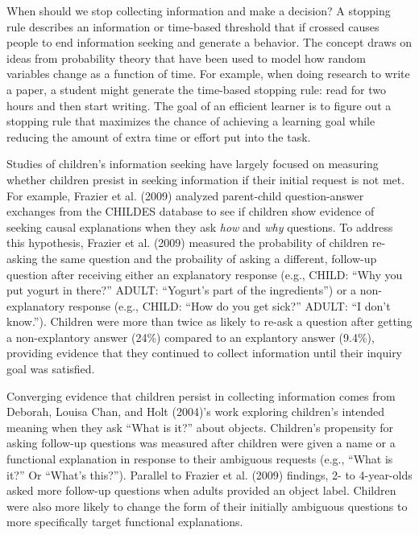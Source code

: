 \documentclass[english,floatsintext,man]{apa6}
\theoremstyle{definition}
\theoremstyle{definition}
\theoremstyle{definition}
\theoremstyle{remark}
\begin{document}
When should we stop collecting information and make a decision? A
stopping rule describes an information or time-based threshold that if
crossed causes people to end information seeking and generate a
behavior. The concept draws on ideas from probability theory that have
been used to model how random variables change as a function of time.
For example, when doing research to write a paper, a student might
generate the time-based stopping rule: read for two hours and then start
writing. The goal of an efficient learner is to figure out a stopping
rule that maximizes the chance of achieving a learning goal while
reducing the amount of extra time or effort put into the task.

Studies of children's information seeking have largely focused on
measuring whether children presist in seeking information if their
initial request is not met. For example, Frazier et al. (2009) analyzed
parent-child question-answer exchanges from the CHILDES database to see
if children show evidence of seeking causal explanations when they ask
\emph{how} and \emph{why} questions. To address this hypothesis, Frazier
et al. (2009) measured the probability of children re-asking the same
question and the probaility of asking a different, follow-up question
after receiving either an explanatory response (e.g., CHILD:
\enquote{Why you put yogurt in there?} ADULT: \enquote{Yogurt's part of
the ingredients}) or a non-explanatory response (e.g., CHILD:
\enquote{How do you get sick?} ADULT: \enquote{I don't know.}). Children
were more than twice as likely to re-ask a question after getting a
non-explantory answer (24\%) compared to an explantory answer (9.4\%),
providing evidence that they continued to collect information until
their inquiry goal was satisfied.

Converging evidence that children persist in collecting information
comes from Deborah, Louisa Chan, and Holt (2004)'s work exploring
children's intended meaning when they ask \enquote{What is it?} about
objects. Children's propensity for asking follow-up questions was
measured after children were given a name or a functional explanation in
response to their ambiguous requests (e.g., \enquote{What is it?} Or
\enquote{What's this?}). Parallel to Frazier et al. (2009) findings, 2-
to 4-year-olds asked more follow-up questions when adults provided an
object label. Children were also more likely to change the form of their
initially ambiguous questions to more specifically target functional
explanations.
\end{document}
